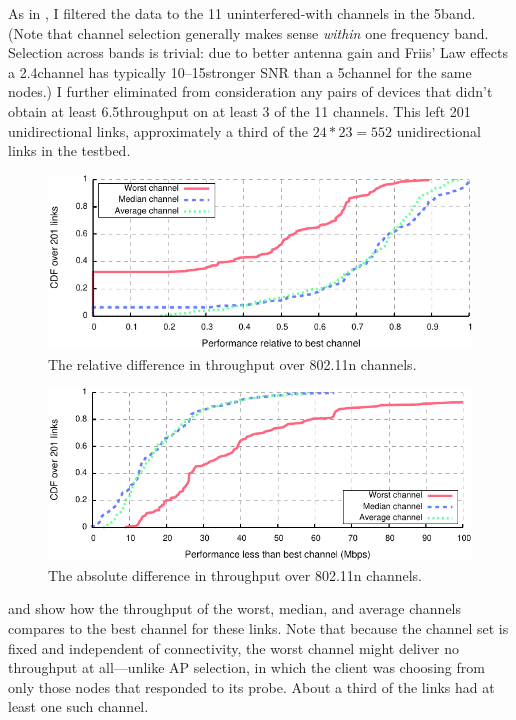 As in , I filtered the data to the 11 uninterfered-with channels in the 5\GHz band. (Note that channel selection generally makes sense \emph{within} one frequency band. Selection across bands is trivial: due to better antenna gain and Friis' Law effects a 2.4\GHz channel has typically 10\dB--15\dB stronger SNR than a 5\GHz channel for the same nodes.) I further eliminated from consideration any pairs of devices that didn't obtain at least 6.5\Mbps throughput on at least 3 of the 11 channels. This left 201 unidirectional links, approximately a third of the $24*23=552$ unidirectional links in the testbed.

\begin{figure}[t]
	\centering
	\includegraphics[width=\textwidth]{figures/applications/chan_sel_rel_diff.pdf}
	\caption[The relative difference in throughput over 802.11n channels]{\label{fig:chan_sel_rel_diff}The relative difference in throughput over 802.11n channels.}
\end{figure}

\begin{figure}[t]
	\centering
	\includegraphics[width=\textwidth]{figures/applications/chan_sel_tpt_diff.pdf}
	\caption[The absolute difference in throughput over 802.11n channels]{\label{fig:chan_sel_tpt_diff}The absolute difference in throughput over 802.11n channels.}
\end{figure}

 and  show how the throughput of the worst, median, and average channels compares to the best channel for these links. Note that because the channel set is fixed and independent of connectivity, the worst channel might deliver no throughput at all---unlike AP selection, in which the client was choosing from only those nodes that responded to its probe. About a third of the links had at least one such channel.

